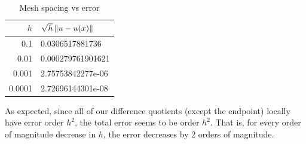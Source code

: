 \documentclass[10pt]{article}
\begin{document}
\begin{solution}
\begin{enumerate}
        \begin{table}[H]\centering\tt
            \begin{tabular}{|r|l|} \hline 
                \( h \) & \( \sqrt{h}\left\lVert u-u(x)\right\rVert \) \\ \hline
                0.1 & 0.0306517881736 \\
                0.01 & 0.000279761901621 \\
                0.001 & 2.75753842277e-06 \\
                0.0001 & 2.72696144301e-08 \\ \hline
            \end{tabular}
            \caption{Mesh spacing vs error}
            \label{fdqerror}
        \end{table}

        As expected, since all of our difference quotients (except the endpoint) locally have error order \( h^2 \), the total error seems to be order \( h^2 \). That is, for every order of magnitude decrease in \( h \), the error decreases by 2 orders of magnitude.

\end{enumerate}
\end{solution}
\end{document}
